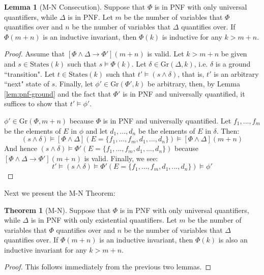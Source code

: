 \documentclass[12pt]{article}
\theoremstyle{definition}
\newtheorem{lemma}{Lemma}
\newtheorem{theorem}{Theorem}
\theoremstyle{remark}
\newcommand{\states}{\text{States}}
\newcommand{\gr}{\text{Gr}}
\begin{document}
\begin{lemma}[M-N Consecution]
  Suppose that $\Phi$ is in PNF with only universal quantifiers, while $\Delta$ is in PNF.  Let $m$ be the number of variables that $\Phi$ quantifies over and $n$ be the number of variables that $\Delta$ quantifies over.  If $\Phi(m+n)$ is an inductive invariant, then $\Phi(k)$ is inductive for any $k>m+n$.
\end{lemma}
\begin{proof}
  Assume that $[\Phi\land\Delta \rightarrow \Phi'](m+n)$ is valid.  Let $k>m+n$ be given and $s \in \states(k)$ such that $s \models \Phi(k)$.  Let $\delta \in \gr(\Delta,k)$, i.e. $\delta$ is a ground ``transition".  Let $t \in \states(k)$ such that $t' \models (s \land \delta)$, that is, $t'$ is an arbitrary ``next" state of $s$.  Finally, let $\phi' \in \gr(\Phi',k)$ be arbitrary, then, by Lemma \ref{lem:pnf-ground} and the fact that $\Phi'$ is in PNF and universally quantified, it suffices to show that $t' \models \phi'$.

  $\phi' \in \gr(\Phi,m+n)$ because $\Phi$ is in PNF and universally quantified.  Let $f_1,...,f_m$ be the elements of $E$ in $\phi$ and let $d_1,...,d_n$ be the elements of $E$ in $\delta$.  Then:
  $$(s \land \delta) \models [\Phi\land\Delta](E=\{f_1,...,f_m,d_1,...,d_n\}) \models [\Phi\land\Delta](m+n)$$
  And hence $(s \land \delta) \models \Phi'(E=\{f_1,...,f_m,d_1,...,d_n\})$ because $[\Phi\land\Delta \rightarrow \Phi'](m+n)$ is valid.  Finally, we see:
  $$t' \models (s \land \delta) \models \Phi'(E=\{f_1,...,f_m,d_1,...,d_n\}) \models \phi'$$
\end{proof}

Next we present the M-N Theorem:

\begin{theorem}[M-N]
  Suppose that $\Phi$ is in PNF with only universal quantifiers, while $\Delta$ is in PNF with only existential quantifiers.  Let $m$ be the number of variables that $\Phi$ quantifies over and $n$ be the number of variables that $\Delta$ quantifies over.  If $\Phi(m+n)$ is an inductive invariant, then $\Phi(k)$ is also an inductive invariant for any $k>m+n$.
\end{theorem}
\begin{proof}
  This follows immediately from the previous two lemmas.
\end{proof}





\end{document}
